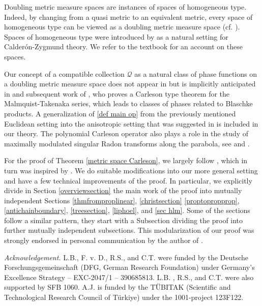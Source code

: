 Doubling metric measure spaces are instances of
spaces of homogeneous type. Indeed, by changing from a quasi metric to an equivalent metric, every space of homogeneous type can be viewed as a doubling metric measure space (cf. \cite{MaciasSegovia}). Spaces of homogeneous type were introduced
by \cite{MR0499948} as a natural setting for Calder\'on-Zygmund theory. We refer to the textbook \cite{stein-book} for an account on these spaces.

Our concept of a compatible collection $\mathcal{Q}$ as a natural class of phase functions on a doubling metric measure space does not
appear in \cite{stein-book} but is implicitly anticipated in \cite{zk-polynomial} and subsequent
work of \cite{mnatsakanyan}, who proves a Carleson type theorem
for the Malmquist-Takenaka series, which leads to classes of phases related to Blaschke products.
A generalization of \eqref{def main op} from the previously mentioned Euclidean setting into the anisotropic setting that
was suggested in \cite{zk-polynomial} is included in our theory.
The polynomial Carleson operator also plays a role in the
study of maximally modulated singular Radon transforms
along the parabola, see \cite{ramos} and \cite{becker2024maximal}.









For the proof of Theorem \ref{metric space Carleson}, we largely follow \cite{zk-polynomial}, which in turn was inspired by \cite{lie-polynomial}.
We do suitable modifications into our more general setting and have a few technical improvements of the proof.  In particular, we explicitly divide
in Section \ref{overviewsection} the main work of the proof into mutually independent
Sections \ref{thmfromproplinear}, \ref{christsection}
\ref{proptopropprop},
\ref{antichainboundary},
\ref{treesection}, \ref{liphoel}, and \ref{sec hlm}.
Some of the sections follow a similar pattern, they start with a Subsection dividing the
proof into further mutually independent subsections.
This modularization of our proof was strongly endorsed in personal communication by the author of \cite{zk-polynomial}.











\noindent \textit{Acknowledgement.}
L.B., F. v. D., R.S., and C.T. were funded by the Deutsche Forschungsgemeinschaft (DFG, German Research Foundation) under Germany's Excellence Strategy -- EXC-2047/1 -- 390685813.
L.B. , R.S., and C.T. were also supported by SFB 1060.
A.J. is funded by the T\"UBITAK (Scientific and Technological Research Council of T\"urkiye) under the 1001-project 123F122.

